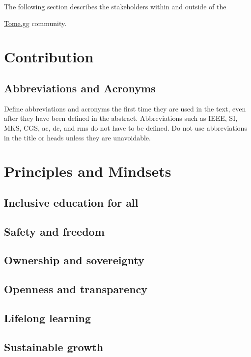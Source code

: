 \documentclass[journal, onecolumn]{IEEEtran}
\newcommand{\tomegg}{
  \href{http://tome.gg}{Tome.gg}
}
\begin{document}
The following section describes the stakeholders within and outside of the
\tomegg community.

\section{Contribution}
\label{sec:contribution}

\subsection{Abbreviations and Acronyms}\label{AA}
Define abbreviations and acronyms the first time they are used in the text, 
even after they have been defined in the abstract. Abbreviations such as 
IEEE, SI, MKS, CGS, ac, dc, and rms do not have to be defined. Do not use 
abbreviations in the title or heads unless they are unavoidable.

\section{Principles and Mindsets}
\label{sec:principles_mindsets}

\subsection{Inclusive education for all}

\subsection{Safety and freedom}

\subsection{Ownership and sovereignty}

\subsection{Openness and transparency}

\subsection{Lifelong learning}

\subsection{Sustainable growth}
\end{document}

